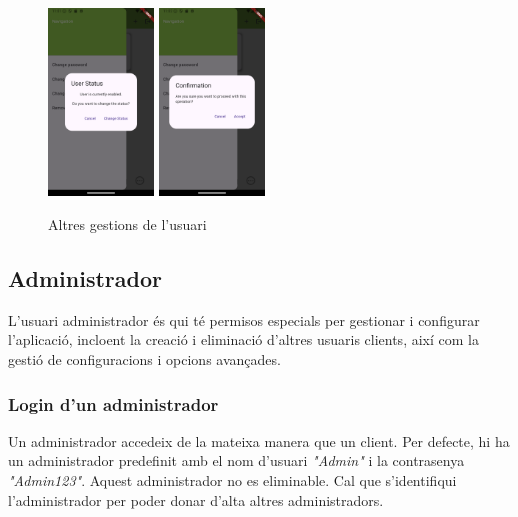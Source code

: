 \documentclass[a4paper,12pt,twoside]{ThesisStyle}
\begin{document}
\begin{figure}[h]
    \includegraphics[width=0.25\textwidth]{imatges/userGestion4.png}
    \includegraphics[width=0.25\textwidth]{imatges/userGestion5.png}
    \caption{Altres gestions de l'usuari}
    \label{fig: Altres gestions de l'usuari}
\end{figure}



\clearpage
\subsection{Administrador}
\label{subsec: Admin}

L'usuari administrador és qui té permisos especials per gestionar i configurar l'aplicació, incloent la creació i eliminació d'altres usuaris clients, així com la gestió de configuracions i opcions avançades.

\subsubsection{Login d'un administrador}
\label{subsubsec: Login d'un administrador}

Un administrador accedeix de la mateixa manera que un client. Per defecte, hi ha un administrador predefinit amb el nom d'usuari \textit{"Admin"} i la contrasenya \textit{"Admin123"}. Aquest administrador no es eliminable. Cal que s'identifiqui l'administrador per poder donar d'alta altres administradors.\\
\end{document}
